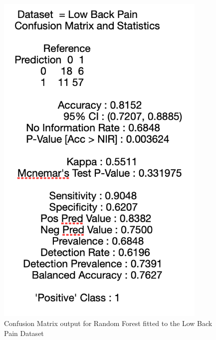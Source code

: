 \begin{figure}[!htbp]
\begin{minipage}{0.45\textwidth}
        \includegraphics[width=0.9\textwidth]{ThesisTemplate/appendix/images/Chapter5Appendix/ConfusionMatrix/LowBackPain.png} 
        \caption{Confusion Matrix output for Random Forest fitted to the Low Back Pain Dataset}
        \label{fig:my_label}
    \end{minipage}
\end{figure}

